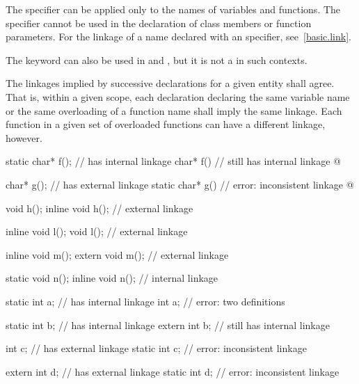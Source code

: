 \pnum
{}%
The  specifier can be applied only to the names of variables
and functions. The  specifier cannot be used in the
declaration of class members or function parameters.
%
%
For the linkage of a name declared with an  specifier,
see~\ref{basic.link}.
\begin{note}
The  keyword can also be used in
 and
, but it is not a
 in such contexts.
\end{note}

\pnum
The linkages implied by successive declarations for a given entity shall
agree. That is, within a given scope, each declaration declaring the
same variable name or the same overloading of a function name shall imply
the same linkage. Each function in a given set of overloaded functions
can have a different linkage, however.
\begin{example}
\begin{codeblock}
static char* f();               //  has internal linkage
char* f()                       //  still has internal linkage
  { @\commentellip@ }

char* g();                      //  has external linkage
static char* g()                // error: inconsistent linkage
  { @\commentellip@ }

void h();
inline void h();                // external linkage

inline void l();
void l();                       // external linkage

inline void m();
extern void m();                // external linkage

static void n();
inline void n();                // internal linkage

static int a;                   //  has internal linkage
int a;                          // error: two definitions

static int b;                   //  has internal linkage
extern int b;                   //  still has internal linkage

int c;                          //  has external linkage
static int c;                   // error: inconsistent linkage

extern int d;                   //  has external linkage
static int d;                   // error: inconsistent linkage
\end{codeblock}
\end{example}

